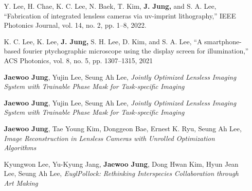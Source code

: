\documentclass[a4paper,12pt]{memoir} %
\begin{document}
{Y. Lee, H. Chae, K. C. Lee, N. Baek, T. Kim, \textbf{J. Jung,} and S. A. Lee, “Fabrication of integrated lensless cameras via uv-imprint lithography,” IEEE Photonics Journal, vol. 14, no. 2, pp. 1–8, 2022.}

\Sep

{K. C. Lee, K. Lee, \textbf{J. Jung,} S. H. Lee, D. Kim, and S. A. Lee, “A smartphone-based fourier ptychographic microscope using the display screen for illumination,” ACS Photonics, vol. 8, no. 5, pp. 1307–1315, 2021}

\Sep %




{\textbf{Jaewoo Jung}, Yujin Lee, Seung Ah Lee, \textit{Jointly Optimized Lensless Imaging System with Trainable Phase Mask for Task-specific Imaging}}



{\textbf{Jaewoo Jung}, Yujin Lee, Seung Ah Lee, \textit{Jointly Optimized Lensless Imaging System with Trainable Phase Mask for Task-specific Imaging}}


{\textbf{Jaewoo Jung}, Tae Young Kim, Donggeon Bae, Ernest K. Ryu, Seung Ah Lee, \textit{Image Reconstruction in Lensless Cameras with Unrolled Optimization Algorithms}}



{Kyungwon Lee, Yu-Kyung Jang, \textbf{Jaewoo Jung}, Dong Hwan Kim, Hyun Jean Lee, Seung Ah Lee, \textit{EuglPollock: Rethinking Interspecies Collaboration through Art Making}}
\end{document}
